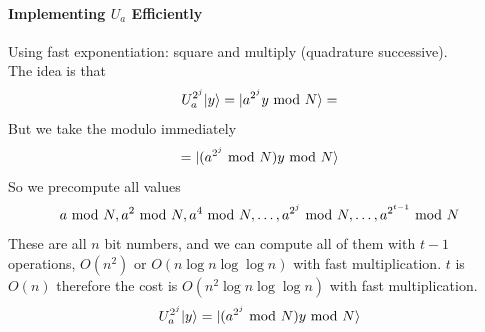 \documentclass[10pt]{report}
\begin{document}
\paragraph{Implementing $U_a$ Efficiently} Using fast exponentiation: square and multiply (quadrature successive).\\
The idea is that $$U_a^{2^j}|y\rangle = |a^{2^j}y\hbox{ mod }N\rangle =$$
But we take the modulo immediately
$$= |(a^{2^j}\hbox{ mod }N)y\hbox{ mod }N\rangle$$
So we precompute all values $$a\hbox{ mod }N,a^2\hbox{ mod }N,a^4\hbox{ mod }N,\ldots,a^{2^j}\hbox{ mod }N,\ldots,a^{2^{t-1}}\hbox{ mod }N$$
These are all $n$ bit numbers, and we can compute all of them with $t-1$ operations, $O(n^2)$ or $O(n\log n\log\log n)$ with fast multiplication. $t$ is $O(n)$ therefore the cost is $O(n^2\log n\log\log n)$ with fast multiplication.
$$U_a^{2^j}|y\rangle = |(a^{2^j}\hbox{ mod }N)y\hbox{ mod }N\rangle$$
\end{document}

